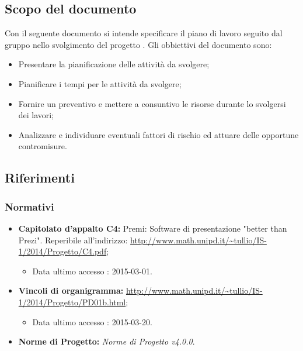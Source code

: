\subsection{Scopo del documento}
Con il seguente documento si intende specificare il piano di lavoro seguito dal gruppo \GRUPPO{} nello svolgimento del progetto \PROGETTO{}.
Gli obbiettivi del documento sono:
\begin{itemize}
	\item Presentare la pianificazione delle attività da svolgere;
	\item Pianificare i tempi per le attività da svolgere;
	\item Fornire un preventivo e mettere a consuntivo le risorse durante lo svolgersi dei lavori;
	\item Analizzare e individuare eventuali fattori di rischio ed attuare delle opportune contromisure.
\end{itemize}

\subsection{Riferimenti}
\subsubsection{Normativi}
\begin{itemize}
	\item \textbf{Capitolato d'appalto C4:} Premi: Software di presentazione "better than Prezi". Reperibile all'indirizzo: \url{http://www.math.unipd.it/~tullio/IS-1/2014/Progetto/C4.pdf};
	\begin{itemize}
		\item Data ultimo accesso : 2015-03-01.						
	\end{itemize}
	\item \textbf{Vincoli di organigramma:} \url{http://www.math.unipd.it/~tullio/IS-1/2014/Progetto/PD01b.html}; 
	\begin{itemize}
		\item Data ultimo accesso : 2015-03-20.						
	\end{itemize}
	\item \textbf{Norme di Progetto:} \textit{Norme di Progetto v4.0.0}.
\end{itemize}
